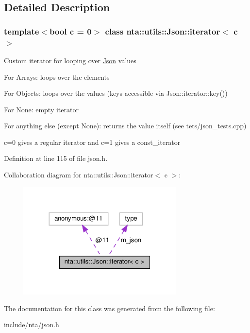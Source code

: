 \subsection{Detailed Description}
\subsubsection*{template$<$bool c = 0$>$\newline
class nta\+::utils\+::\+Json\+::iterator$<$ c $>$}

Custom iterator for looping over \hyperlink{classnta_1_1utils_1_1Json}{Json} values

For Arrays\+: loops over the elements

For Objects\+: loops over the values (keys accessible via Json\+::iterator\+::key())

For None\+: empty iterator

For anything else (except None)\+: returns the value itself (see tets/json\+\_\+tests.\+cpp)

c=0 gives a regular iterator and c=1 gives a const\+\_\+iterator 

Definition at line 115 of file json.\+h.



Collaboration diagram for nta\+:\+:utils\+:\+:Json\+:\+:iterator$<$ c $>$\+:\nopagebreak
\begin{figure}[H]
\begin{center}
\leavevmode
\includegraphics[width=236pt]{da/dc2/classnta_1_1utils_1_1Json_1_1iterator__coll__graph}
\end{center}
\end{figure}


The documentation for this class was generated from the following file\+:\begin{DoxyCompactItemize}
\item 
include/nta/json.\+h\end{DoxyCompactItemize}
